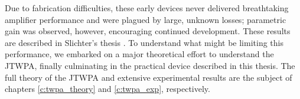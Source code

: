 Due to fabrication difficulties, these early devices never delivered breathtaking amplifier performance and were plagued by large, unknown losses; parametric gain was observed, however, encouraging continued development.  These results are described in Slichter's thesis \cite{slichterthesis}.  To understand what might be limiting this performance, we embarked on a major theoretical effort to understand the JTWPA, finally culminating in the practical device described in this thesis.  The full theory of the JTWPA and extensive experimental results are the subject of chapters \ref{c:twpa_theory} and \ref{c:twpa_exp}, respectively.





















